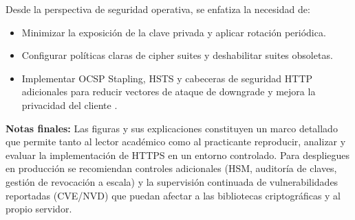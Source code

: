 Desde la perspectiva de seguridad operativa, se enfatiza la necesidad de:

\begin{itemize}
    \item Minimizar la exposición de la clave privada y aplicar rotación periódica.
    \item Configurar políticas claras de cipher suites y deshabilitar suites obsoletas.
    \item Implementar OCSP Stapling, HSTS y cabeceras de seguridad HTTP adicionales para reducir vectores de ataque de downgrade y mejora la privacidad del cliente \cite{rfc7525, liu2015}.
\end{itemize}

\bigskip

\noindent\textbf{Notas finales:} Las figuras y sus explicaciones constituyen un marco detallado que permite tanto al lector académico como al practicante reproducir, analizar y evaluar la implementación de HTTPS en un entorno controlado. Para despliegues en producción se recomiendan controles adicionales (HSM, auditoría de claves, gestión de revocación a escala) y la supervisión continuada de vulnerabilidades reportadas (CVE/NVD) que puedan afectar a las bibliotecas criptográficas y al propio servidor.
